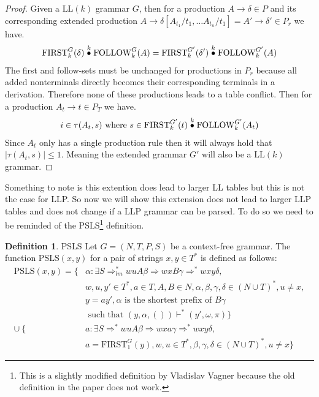 \documentclass[a4paper,12pt]{article}
\newcommand{\truncprod}[1]{\stackrel{\mathclap{#1}}{\bullet}}
\newcommand\LL{\text{LL}}
\newcommand\PSLS{\text{PSLS}}
\newcommand\FIRST{\text{FIRST}}
\newcommand\FOLLOW{\text{FOLLOW}}
\theoremstyle{definition}
\newtheorem{definition}{Definition}[section]
\begin{document}
\begin{proof}
  Given a $\LL(k)$ grammar $G$, then for a production $A \to \delta \in P$ and its corresponding extended production $A \to \delta[A_{t_1}/t_1, \dots A_{t_n}/t_1] = A' \to \delta' \in P_r$ we have.
  \begin{align*}
    \FIRST^G_k(\delta) \truncprod{k} \FOLLOW^G_k(A) = \FIRST^{G'}_k(\delta') \truncprod{k} \FOLLOW^{G'}_k(A)
  \end{align*}
  The first and follow-sets must be unchanged for productions in $P_r$ because all added nonterminals directly becomes their corresponding terminals in a derivation. Therefore none of these productions leads to a table conflict. Then for a production $A_t \to t \in P_T$ we have.
  \begin{gather*}
    i \in \tau(A_t, s) \text{ where } s \in \FIRST^{G'}_k(t) \truncprod{k} \FOLLOW^{G'}_k(A_t)
  \end{gather*}
  Since $A_t$ only has a single production rule then it will always hold that $|\tau(A_t, s)| \leq 1$. Meaning the extended grammar $G'$ will also be a $\LL(k)$ grammar.
\end{proof}
Something to note is this extention does lead to larger LL tables but this is not the case for LLP. So now we will show this extension does not lead to larger LLP tables and does not change if a LLP grammar can be parsed. To do so we need to be reminded of the PSLS\footnote{This is a slightly modified definition by Vladislav Vagner because the old definition in the paper does not work.} \cite{Vagner2007} definition.
\begin{definition}{PSLS}
  Let $G = (N, T, P, S)$ be a context-free grammar. The function $\PSLS(x, y)$ for a pair of strings $x, y \in T^*$ is defined as follows:
  \begin{align*}
    \text{PSLS}(x, y) = \{ & \alpha : \exists S \Rightarrow^*_{lm} wuA\beta \Rightarrow wxB\gamma \Rightarrow^* wxy\delta, \\
    & w, u, y' \in T^*, a \in T, A, B \in N, \alpha, \beta, \gamma, \delta \in (N \cup T)^*, u \neq x, \\
    & y = ay', \alpha \text{ is the shortest prefix of } B\gamma \\ 
    & \text{ such that } (y, \alpha, ()) \vdash^* (y', \omega, \pi)\} \\
    \cup \: \{ & a : \exists S \Rightarrow^* wuA\beta \Rightarrow wxa\gamma \Rightarrow^* wxy\delta, \\
    & a = \text{FIRST}^G_1(y), w,u \in T^*, \beta, \gamma, \delta \in (N \cup T)^*, u \neq x \}
  \end{align*}
\end{definition}
\end{document}
